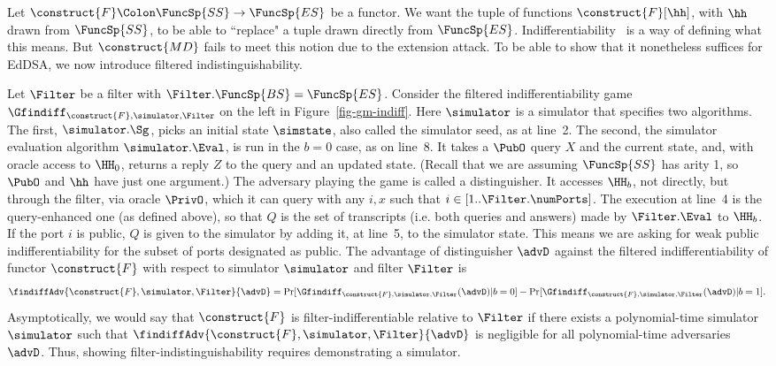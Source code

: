  Let $\construct{F} \Colon \FuncSp{SS} \to \FuncSp{ES}$ be a functor. We want the tuple of functions $\construct{F}[\hh]$, with $\hh$ drawn from $\FuncSp{SS}$, to be able to ``replace" a tuple drawn directly from $\FuncSp{ES}$.  Indifferentiability~\cite{TCC:MauRenHol04} is a way of defining what this means. But $\construct{MD}$ fails to meet this notion due to the extension attack. To be able to show that it nonetheless suffices for EdDSA, we now introduce filtered indistinguishability.

Let $\Filter$ be a filter with $\Filter.\FuncSp{BS}=\FuncSp{ES}$. Consider the filtered indifferentiability game $\Gfindiff_{\construct{F}, \simulator, \Filter}$ on the left in Figure~\ref{fig-gm-indiff}. Here $\simulator$ is a simulator that specifies two algorithms. The first, $\simulator.\Sg$, picks an initial state $\simstate$, also called the simulator seed, as at line~2. The second, the simulator evaluation algorithm $\simulator.\Eval$, is run in the $b=0$ case, as on line~8. It takes a $\PubO$ query $X$ and the current state, and, with oracle access to $\HH_0$, returns a reply $Z$ to the query and an updated state. (Recall that we are assuming $\FuncSp{SS}$ has arity 1, so $\PubO$ and $\hh$ have just one argument.)
The adversary playing the game is called a distinguisher. It accesses $\HH_b$, not directly, but through the filter, via oracle $\PrivO$, which it can query with any $i,x$ such that $i\in [1..\Filter.\numPorts]$. The execution at line~4 is the query-enhanced one (as defined above), so that $Q$ is the set of transcripts (i.e. both queries and answers) made by $\Filter.\Eval$ to $\HH_b$. If the port $i$ is public, $Q$ is given to the simulator by adding it, at line~5, to the simulator state. This means we are asking for weak public indifferentiability for the subset of ports designated as public. The advantage of distinguisher $\advD$ against the filtered indifferentiability of functor $\construct{F}$ with respect to simulator $\simulator$ and filter $\Filter$ is
\[\findiffAdv{\construct{F},  \simulator, \Filter}{\advD} = \Pr[\Gfindiff_{\construct{F},  \simulator, \Filter}(\advD) | b=0] - \Pr[\Gfindiff_{\construct{F},  \simulator, \Filter}(\advD) | b=1].\]
Asymptotically, we would say that $\construct{F}$ is filter-indifferentiable relative to $\Filter$ if there exists a polynomial-time simulator $\simulator$ such that $\findiffAdv{\construct{F},  \simulator, \Filter}{\advD}$ is negligible for all polynomial-time adversaries $\advD$. Thus, showing filter-indistinguishability requires demonstrating a simulator.

